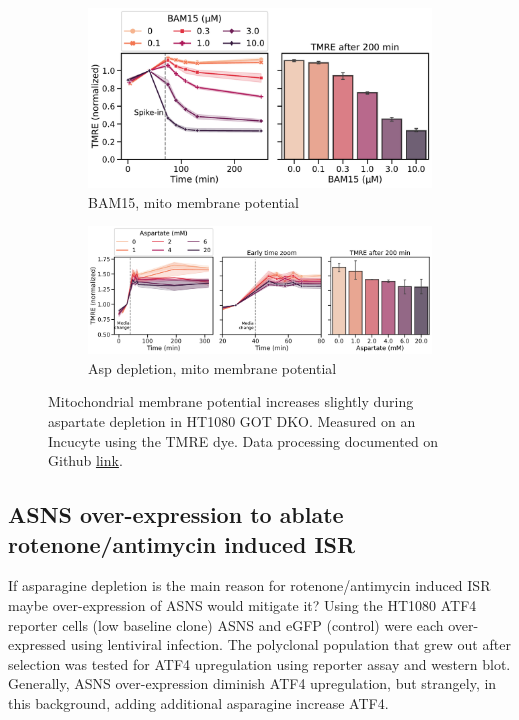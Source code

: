 \begin{figure}[!ht]
     \centering
     \begin{subfigure}[b]{0.6\textwidth}
         \includegraphics[width=\textwidth]{figures/sapp/ISR/HT1080_GOT_DKO_TMRA_BAM15tit.pdf}
         \caption{BAM15, mito membrane potential}
         \label{fig:sapp:ISR:HT1080_GOT_DKO_TMRA_BAM15tit}
     \end{subfigure}
     \hfill
     \begin{subfigure}[b]{0.85\textwidth}
         \includegraphics[width=\textwidth]{figures/sapp/ISR/HT1080_GOT_DKO_TMRA_ASPtit.pdf}
         \caption{Asp depletion, mito membrane potential}
         \label{fig:sapp:ISR:HT1080_GOT_DKO_TMRA_ASPtit}
     \end{subfigure}
     \hfill
        \caption[Mito membrane potential in GOT DKO]{
        Mitochondrial membrane potential increases slightly during aspartate depletion in HT1080 GOT DKO.
        Measured on an Incucyte using the TMRE dye.
        Data processing documented on Github \href{https://github.com/krdav/IncuCyte_TMRE-assay}{link}.
        }
        \label{fig:sapp:ISR:HT1080_GOT_DKO_TMRE}
\end{figure}






\FloatBarrier
\subsection{ASNS over-expression to ablate rotenone/antimycin induced ISR}
If asparagine depletion is the main reason for rotenone/antimycin induced ISR maybe over-expression of ASNS would mitigate it?
Using the HT1080 ATF4 reporter cells (low baseline clone) ASNS and eGFP (control) were each over-expressed using lentiviral infection.
The polyclonal population that grew out after selection was tested for ATF4 upregulation using reporter assay and western blot.
Generally, ASNS over-expression diminish ATF4 upregulation, but strangely, in this background, adding additional asparagine increase ATF4.

